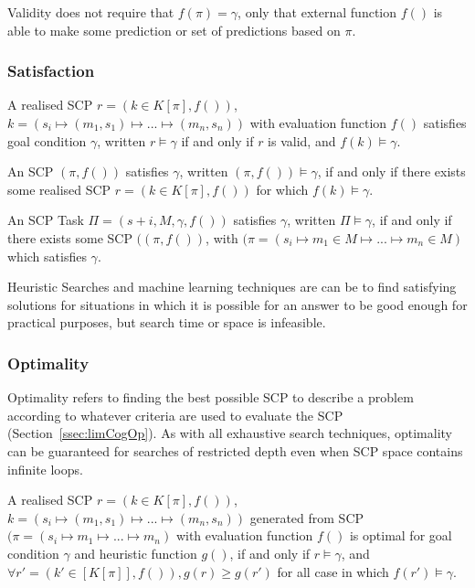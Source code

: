 Validity does not require that $f(\pi)=\gamma$, only that external function $f()$ is able to make some prediction or set of predictions based on $\pi$.


\subsubsection{Satisfaction} 

A realised SCP $r=(k \in K[\pi],f())$, $k=(s_i \longmapsto (m_1,s_1) \longmapsto ... \longmapsto (m_n,s_n))$ with evaluation function $f()$ satisfies goal condition $\gamma$, written $r\models \gamma$ if and only if $r$ is valid, and $f(k)\models \gamma$. 

An SCP $(\pi,f())$ satisfies $\gamma$, written $(\pi,f())\models \gamma$, if and only if there exists some realised SCP $r=(k \in K[\pi],f())$ for which $f(k)\models \gamma$.

An SCP Task $\Pi=(s+i, M, \gamma, f())$ satisfies $\gamma$, written $\Pi\models \gamma$, if and only if there exists some SCP $((\pi,f())$, with $(\pi=(s_i \longmapsto m_1 \in M \longmapsto ... \longmapsto m_n \in M)$ which satisfies $\gamma$.

Heuristic Searches and machine learning techniques are can be to find satisfying solutions for situations in which it is possible for an answer to be good enough for practical purposes, but search time or space is infeasible. 

\subsubsection{Optimality}
Optimality refers to finding the best possible SCP to describe a problem according to whatever criteria are used to evaluate the SCP (Section~\ref{ssec:limCogOp}). As with all exhaustive search techniques, optimality can be guaranteed for searches of restricted depth even when SCP space contains infinite loops.

A realised SCP $r=(k \in K[\pi],f())$, $k=(s_i \longmapsto (m_1,s_1) \longmapsto ... \longmapsto (m_n,s_n))$ generated from SCP $(\pi=(s_i \longmapsto m_1 \longmapsto ... \longmapsto m_n)$ with evaluation function $f()$ is optimal for goal condition $\gamma$ and heuristic function $g()$, if and only if $r\models\gamma$, and $\forall r'=(k' \in [K[\pi]], f()), g(r)\geq g(r')$ for all case in which $f(r') \models \gamma$. 

